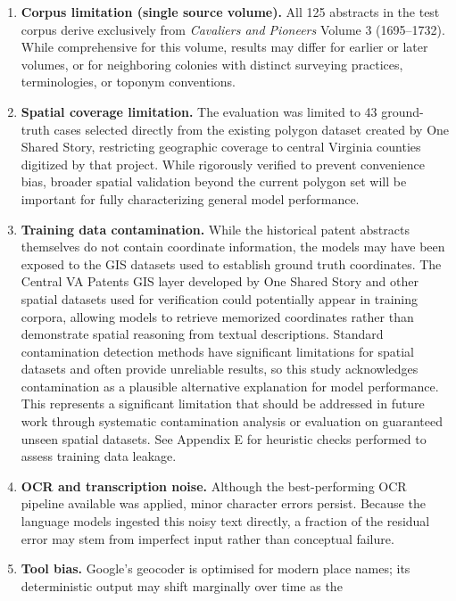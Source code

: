 \begin{enumerate}
\def\labelenumi{\arabic{enumi}.}
\item
  \textbf{Corpus limitation (single source volume).} All 125 abstracts
  in the test corpus derive exclusively from \emph{Cavaliers and
  Pioneers} Volume 3 (1695--1732). While comprehensive for this volume,
  results may differ for earlier or later volumes, or for neighboring
  colonies with distinct surveying practices, terminologies, or toponym
  conventions.
\item
  \textbf{Spatial coverage limitation.} The evaluation was limited to 43
  ground-truth cases selected directly from the existing polygon dataset
  created by One Shared Story, restricting geographic coverage to
  central Virginia counties digitized by that project. While rigorously
  verified to prevent convenience bias, broader spatial validation
  beyond the current polygon set will be important for fully
  characterizing general model performance.
\item
  \textbf{Training data contamination.} While the historical patent
  abstracts themselves do not contain coordinate information, the models
  may have been exposed to the GIS datasets used to establish ground
  truth coordinates. The Central VA Patents GIS layer developed by One
  Shared Story \citep{central_va_patents_gis} and other spatial datasets
  used for verification could potentially appear in training corpora,
  allowing models to retrieve memorized coordinates rather than
  demonstrate spatial reasoning from textual descriptions. Standard
  contamination detection methods have significant limitations for
  spatial datasets and often provide unreliable results, so this study
  acknowledges contamination as a plausible alternative explanation for
  model performance. This represents a significant limitation that
  should be addressed in future work through systematic contamination
  analysis or evaluation on guaranteed unseen spatial datasets. See
  Appendix E for heuristic checks performed to assess training data
  leakage.
\item
  \textbf{OCR and transcription noise.} Although the best-performing OCR
  pipeline available was applied, minor character errors persist.
  Because the language models ingested this noisy text directly, a
  fraction of the residual error may stem from imperfect input rather
  than conceptual failure.
\item
  \textbf{Tool bias.} Google's geocoder is optimised for modern place
  names; its deterministic output may shift marginally over time as the

\end{enumerate}
